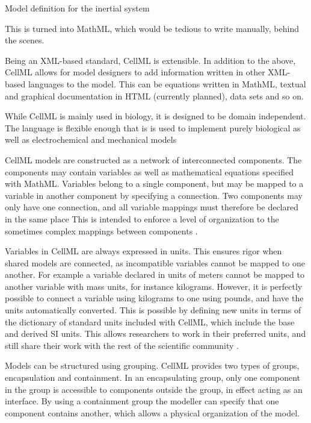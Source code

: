 \documentclass[\rootfolder/main.tex]{subfiles}
\begin{document}
\begin{listing}[ht]
    \inputminted[fontsize=\footnotesize, firstline=28]{matlab}{\rootfolder/Models/OpenCOR/Inertial.input}
    \caption{Model definition for the inertial system\label{lst:inertial-cellml-model}}
\end{listing}

This is turned into MathML, which would be tedious to write manually, behind the scenes.

Being an XML-based standard, CellML is extensible.
In addition to the above, CellML allows for model designers to add information written in other XML-based languages to the model.
This can be equations written in MathML, textual and graphical documentation in HTML (currently planned), data sets and so on.

While CellML is mainly used in biology, it is designed to be domain independent.
The language is flexible enough that is is used to implement purely biological as well as electrochemical and mechanical models \cite{cuellar2003}

CellML models are constructed as a network of interconnected components.
The components may contain variables as well as mathematical equations specified with MathML.
Variables belong to a single component, but may be mapped to a variable in another component by specifying a connection.
Two components may only have one connection, and all variable mappings must therefore be declared in the same place
This is intended to enforce a level of organization to the sometimes complex mappings between components \cite{cuellar2003}.

Variables in CellML are always expressed in units.
This ensures rigor when shared models are connected, as incompatible variables cannot be mapped to one another.
For example a variable declared in units of meters cannot be mapped to another variable with mass units, for instance kilograms.
However, it is perfectly possible to connect a variable using kilograms to one using pounds, and have the units automatically converted.
This is possible by defining new units in terms of the dictionary of standard units included with CellML, which include the base and derived SI units.
This allows researchers to work in their preferred units, and still share their work with the rest of the scientific community \cite{cuellar2003}.

Models can be structured using grouping.
CellML provides two types of groups, encapsulation and containment.
In an encapsulating group, only one component in the group is accessible to components outside the group, in effect acting as an interface.
By using a containment group the modeller can specify that one component contains another, which allows a physical organization of the model.
\end{document}
